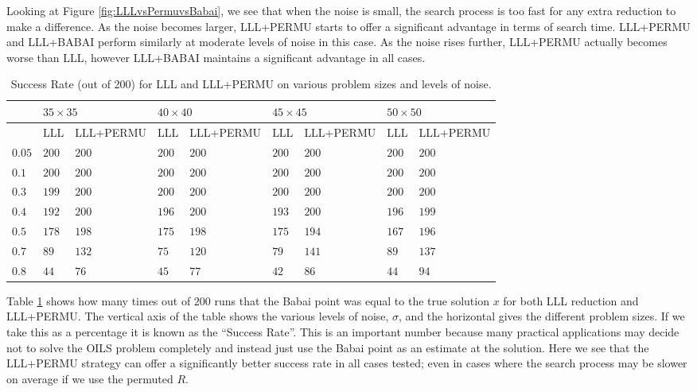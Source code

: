 \documentclass[12pt,Bold,letterpaper]{mcgilletdclass}
\begin{document}
Looking at Figure \ref{fig:LLLvsPermuvsBabai}, we see that when the noise is
small, the search process is too fast for any extra reduction to make a
difference. As the noise becomes larger, LLL+PERMU starts to offer a significant
advantage in terms of search time. LLL+PERMU and LLL+BABAI perform similarly at
moderate levels of noise in this case. As the noise rises further, LLL+PERMU
actually becomes worse than LLL, however LLL+BABAI maintains a significant
advantage in all cases.

\begin{table}
\caption{Success Rate (out of 200) for LLL and LLL+PERMU on various problem
sizes and levels of noise.}
\label{tab:successRates}
\begin{tabular}{|l|l|l|l|l|l|l|l|l|}
\hline
&               \multicolumn{2}{|l|}{$35 \times 35$} & \multicolumn{2}{|l|}{$40
\times 40$} &\multicolumn{2}{|l|}{$45 \times 45$} & \multicolumn{2}{|l|}{$50
\times 50$} \\ \hline
&               LLL & LLL+PERMU & LLL & LLL+PERMU & LLL & LLL+PERMU & LLL &
LLL+PERMU \\ \hline
$0.05$&         $200$ & $200$ & $200$ & $200$ & $200$ & $200$ & $200$ & $200$ 
\\ \hline        
$0.1$&           $200$ & $200$ & $200$ & $200$ & $200$ & $200$ & $200$ & $200$
\\ \hline
$0.3$&           $199$ & $200$ & $200$ & $200$ & $200$ & $200$ & $200$ & $200$
\\ \hline
$0.4$&           $192$ & $200$ & $196$ & $200$ & $193$ & $200$ & $196$ & $199$
\\ \hline
$0.5$&           $178$ & $198$ & $175$ & $198$ & $175$ & $194$ & $167$ & $196$
\\ \hline
$0.7$&            $89$ & $132$ &  $75$ & $120$ & $79$  & $141$ & $89$  & $137$
\\ \hline
$0.8$&            $44$ &  $76$ &  $45$ &  $77$ & $42$  & $86$  & $44$  & $94$
\\ 
\hline
\end{tabular}
\end{table}

Table \ref{tab:successRates} shows how many times out of $200$ runs that the
Babai point was equal to the true solution $x$ for both LLL reduction and
LLL+PERMU. The vertical axis of the table shows the various levels of noise,
$\sigma$, and the horizontal gives the different problem sizes. If we take this
as a percentage it is known as the ``Success Rate''. This is an important number
because many practical applications may decide not to solve the OILS problem
completely and instead just use the Babai point as an estimate at the solution.
Here we see that the LLL+PERMU strategy can offer a significantly better success
rate in all cases tested; even in cases where the search process may be slower
on average if we use the permuted $R$.
\end{document}
